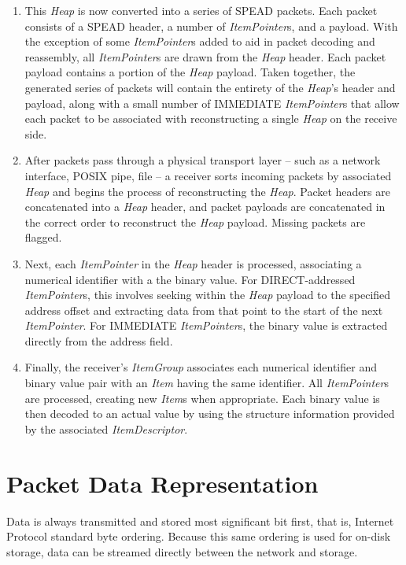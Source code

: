 \documentclass[11pt,english,twoside]{article}
\begin{document}
\begin{enumerate}
\item This \emph{Heap} is now converted into a series of SPEAD packets.  Each packet consists of a SPEAD header, a number of
\emph{ItemPointer}s, and a payload.  With the exception of some \emph{ItemPointer}s added to aid in packet decoding and reassembly,
all \emph{ItemPointer}s are drawn from the \emph{Heap} header.  Each packet payload contains a portion of the \emph{Heap} payload.  Taken
together, the generated series of packets will contain the entirety of the \emph{Heap}'s header and payload, along with a small number of
IMMEDIATE \emph{ItemPointer}s that allow each packet to be associated with reconstructing a single \emph{Heap} on the receive side.

\item After packets pass through a physical transport layer -- such as a network interface, POSIX pipe, file -- a receiver sorts incoming
packets by associated \emph{Heap} and begins the process of reconstructing the \emph{Heap}.  Packet headers are concatenated into a \emph{Heap}
header, and packet payloads are concatenated in the correct order to reconstruct the \emph{Heap} payload. Missing packets are flagged.

\item Next, each \emph{ItemPointer} in the \emph{Heap} header is processed, associating a numerical identifier with a the binary value.  For
DIRECT-addressed \emph{ItemPointer}s, this involves seeking within the \emph{Heap} payload to the specified address offset and extracting data
from that point to the start of the next \emph{ItemPointer}.  For IMMEDIATE \emph{ItemPointer}s, the binary value is extracted directly from the
address field.

\item Finally, the receiver's \emph{ItemGroup} associates each numerical identifier and binary value pair with an \emph{Item} having the same
identifier.  All \emph{ItemPointer}s are processed, creating new \emph{Item}s when appropriate.  Each binary value is then decoded to an actual
value by using the structure information provided by the associated \emph{ItemDescriptor}.

\end{enumerate}


\section{Packet Data Representation}

Data is always transmitted and stored most significant bit first, that is, Internet Protocol standard byte ordering.  Because this same ordering
is used for on-disk storage, data can be streamed directly between the network and storage.
\end{document}
